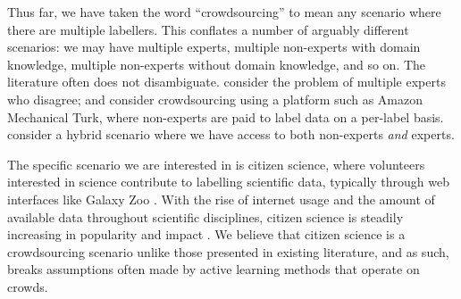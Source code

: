     Thus far, we have taken the word ``crowdsourcing'' to mean any scenario
    where there are multiple labellers. This conflates a number of arguably
    different scenarios: we may have multiple experts, multiple non-experts with
    domain knowledge, multiple non-experts without domain knowledge, and so on.
    The literature often does not disambiguate. \citet{raykar10} consider the
    problem of multiple experts who disagree; \citet{yan10} and
    \citet{mozafari12} consider crowdsourcing using a platform such as Amazon
    Mechanical Turk, where non-experts are paid to label data on a per-label
    basis. \citet{nguyen15} consider a hybrid scenario where we have access to
    both non-experts \emph{and} experts.

    The specific scenario we are interested in is citizen science, where
    volunteers interested in science contribute to labelling scientific data,
    typically through web interfaces like Galaxy Zoo \citep{lintott11}. With the
    rise of internet usage and the amount of available data throughout
    scientific disciplines, citizen science is steadily increasing in popularity
    and impact \citep{marshall15}. We believe that citizen science is a
    crowdsourcing scenario unlike those presented in existing literature, and as
    such, breaks assumptions often made by active learning methods that operate
    on crowds.


